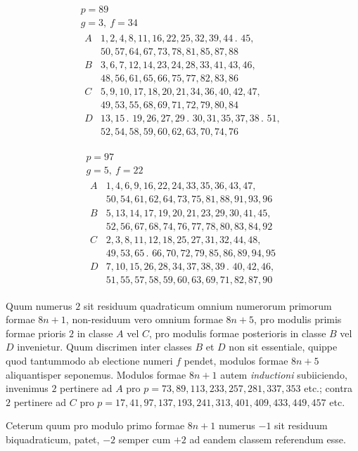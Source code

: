 %
\[
\begin{gathered}
p=89\\
g=3,\ f=34\\[3pt]
\begin{array}{c|l}
A&1,2,4,8,11,16,22,25,32,39,44\mathpunct{.}\,45,\\
&50,57,64,67,73,78,81,85,87,88\\
B&3,6,7,12,14,23,24,28,33,41,43,46,\\
&48,56,61,65,66,75,77,82,83,86\\
C&5,9,10,17,18,20,21,34,36,40,42,47,\\
&49,53,55,68,69,71,72,79,80,84\\
D&13,15\mathpunct{.}\,19,26,27,29\mathpunct{.}\,30,31,35,37,38\mathpunct{.}\,51,\\
&52,54,58,59,60,62,63,70,74,76
\end{array}
\end{gathered}
\]

\[
\begin{gathered}
p=97\\
g=5,\ f=22\\[3pt]
\begin{array}{c|l}
A&1,4,6,9,16,22,24,33,35,36,43,47,\\
&50,54,61,62,64,73,75,81,88,91,93,96\\
B&5,13,14,17,19,20,21,23,29,30,41,45,\\
&52,56,67,68,74,76,77,78,80,83,84,92\\
C&2,3,8,11,12,18,25,27,31,32,44,48,\\
&49,53,65\mathpunct{.}\,66,70,72,79,85,86,89,94,95\\
D&7,10,15,26,28,34,37,38,39\mathpunct{.}\,40,42,46,\\
&51,55,57,58,59,60,63,69,71,82,87,90
\end{array}
\end{gathered}
\]

Quum numerus $2$ sit residuum quadraticum omnium numerorum primorum formae $8n+1$, non-residuum vero omnium formae $8n+5$, pro modulis primis formae prioris $2$ in classe $A$ vel $C$, pro modulis formae posterioris in classe $B$ vel $D$ invenietur. Quum discrimen inter classes $B$ et $D$ non sit essentiale, quippe quod tantummodo ab electione numeri $f$ pendet, modulos formae $8n+5$ aliquantisper seponemus. Modulos formae $8n+1$ autem \emph{inductioni} subiiciendo, invenimus $2$ pertinere ad $A$ pro $p=73,89,113,233,257,281,337,353$ etc.; contra $2$ pertinere ad $C$ pro $p=17,41,97,137,193,241,313,401,409,433,449,457$ etc.

Ceterum quum pro modulo primo formae $8n+1$ numerus $-1$ sit residuum biquadraticum, patet, $-2$ semper cum $+2$ ad eandem classem referendum esse.

